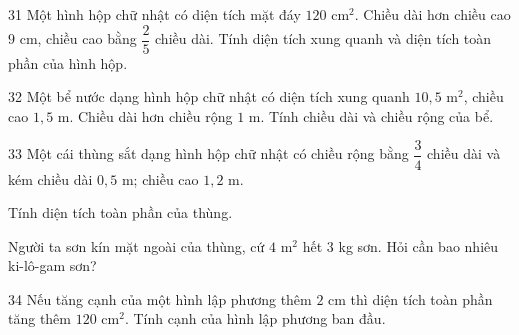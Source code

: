 \begin{probbox}{31}{}
Một hình hộp chữ nhật có diện tích mặt đáy $120$ cm$^2$. Chiều dài hơn chiều cao $9$ cm, chiều cao bằng $\dfrac25$ chiều dài. Tính diện tích xung quanh và diện tích toàn phần của hình hộp.
\end{probbox}
\gap
\begin{probbox}{32}{}
Một bể nước dạng hình hộp chữ nhật có diện tích xung quanh $10{,}5$ m$^2$, chiều cao $1{,}5$ m. Chiều dài hơn chiều rộng $1$ m. Tính chiều dài và chiều rộng của bể.
\end{probbox}
\gap
\begin{probbox}{33}{}
Một cái thùng sắt dạng hình hộp chữ nhật có chiều rộng bằng $\dfrac34$ chiều dài và kém chiều dài $0{,}5$ m; chiều cao $1{,}2$ m.\par
{} Tính diện tích toàn phần của thùng.\par
{} Người ta sơn kín mặt ngoài của thùng, cứ $4$ m$^2$ hết $3$ kg sơn. Hỏi cần bao nhiêu ki-lô-gam sơn?
\end{probbox}
\gap
\begin{probbox}{34}{}
Nếu tăng cạnh của một hình lập phương thêm $2$ cm thì diện tích toàn phần tăng thêm $120$ cm$^2$. Tính cạnh của hình lập phương ban đầu.
\end{probbox}
